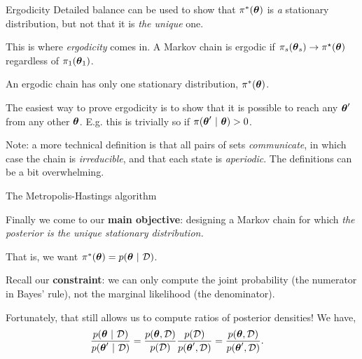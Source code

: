 \documentclass[aspectratio=169]{beamer}
\begin{document}
\begin{frame}{Ergodicity}
Detailed balance can be used to show that $\pi^*(\boldsymbol{\theta})$ is \textit{a} stationary distribution, but not that it is \textit{the unique} one.

This is where \textit{ergodicity} comes in. A Markov chain is ergodic if $\pi_s(\boldsymbol{\theta}_s) \to \pi^\star(\boldsymbol{\theta})$ regardless of $\pi_1(\boldsymbol{\theta}_1)$.

An ergodic chain has only one stationary distribution, $\pi^*(\boldsymbol{\theta})$. 

The easiest way to prove ergodicity is to show that it is possible to reach any $\boldsymbol{\theta}'$ from any other $\boldsymbol{\theta}$. E.g. this is trivially so if $\pi(\boldsymbol{\theta}' ~\vert~ \boldsymbol{\theta}) > 0$. 

Note: a more technical definition is that all pairs of sets \textit{communicate}, in which case the chain is \textit{irreducible}, and that each state is \textit{aperiodic}. The definitions can be a bit overwhelming.

\end{frame} 

\begin{frame}{The Metropolis-Hastings algorithm}

Finally we come to our \textbf{main objective}: designing a Markov chain for which \textit{the posterior is the unique stationary distribution.} 

That is, we want $\pi^*(\boldsymbol{\theta}) = p(\boldsymbol{\theta} ~\vert~ \mathcal{D})$.

Recall our \textbf{constraint}: we can only compute the joint probability (the numerator in Bayes' rule), not the marginal likelihood (the denominator).

Fortunately, that still allows us to compute ratios of posterior densities! We have,
\begin{align}
    \frac{p(\boldsymbol{\theta} ~\vert~ \mathcal{D})}{p(\boldsymbol{\theta}' ~\vert~ \mathcal{D})} 
    &= 
    \frac{p(\boldsymbol{\theta}, \mathcal{D})}{p(\mathcal{D})} \frac{p(\mathcal{D})}{p(\boldsymbol{\theta}',  \mathcal{D})} 
    = \frac{p(\boldsymbol{\theta}, \mathcal{D})}{p(\boldsymbol{\theta}',  \mathcal{D})}.
\end{align}
    
\end{frame}
\end{document}
